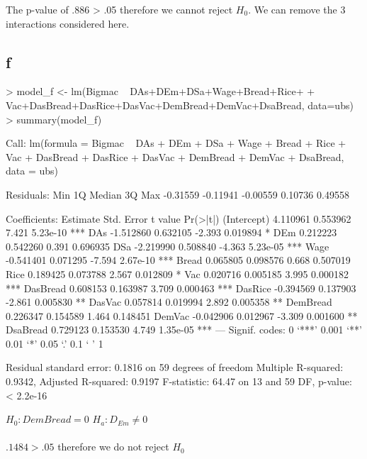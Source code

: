 \documentclass{article}
\begin{document}
The p-value of .886 > .05 therefore we cannot reject $H_0$. We can remove the 3 interactions considered here. 

\subsection*{f}
\begin{Schunk}
\begin{Sinput}
> model_f <- lm(Bigmac ~ DAs+DEm+DSa+Wage+Bread+Rice+
+                 Vac+DasBread+DasRice+DasVac+DemBread+DemVac+DsaBread, data=ubs)
> summary(model_f)
\end{Sinput}
\begin{Soutput}
Call:
lm(formula = Bigmac ~ DAs + DEm + DSa + Wage + Bread + Rice + 
    Vac + DasBread + DasRice + DasVac + DemBread + DemVac + DsaBread, 
    data = ubs)

Residuals:
     Min       1Q   Median       3Q      Max 
-0.31559 -0.11941 -0.00559  0.10736  0.49558 

Coefficients:
             Estimate Std. Error t value Pr(>|t|)    
(Intercept)  4.110961   0.553962   7.421 5.23e-10 ***
DAs         -1.512860   0.632105  -2.393 0.019894 *  
DEm          0.212223   0.542260   0.391 0.696935    
DSa         -2.219990   0.508840  -4.363 5.23e-05 ***
Wage        -0.541401   0.071295  -7.594 2.67e-10 ***
Bread        0.065805   0.098576   0.668 0.507019    
Rice         0.189425   0.073788   2.567 0.012809 *  
Vac          0.020716   0.005185   3.995 0.000182 ***
DasBread     0.608153   0.163987   3.709 0.000463 ***
DasRice     -0.394569   0.137903  -2.861 0.005830 ** 
DasVac       0.057814   0.019994   2.892 0.005358 ** 
DemBread     0.226347   0.154589   1.464 0.148451    
DemVac      -0.042906   0.012967  -3.309 0.001600 ** 
DsaBread     0.729123   0.153530   4.749 1.35e-05 ***
---
Signif. codes:  0 ‘***’ 0.001 ‘**’ 0.01 ‘*’ 0.05 ‘.’ 0.1 ‘ ’ 1

Residual standard error: 0.1816 on 59 degrees of freedom
Multiple R-squared:  0.9342,	Adjusted R-squared:  0.9197 
F-statistic: 64.47 on 13 and 59 DF,  p-value: < 2.2e-16
\end{Soutput}
\end{Schunk}
$H_0: DemBread=0$
$H_a: D_{Em}\neq0$
\\\\
$.1484 > .05$ therefore we do not reject $H_0$
\end{document}
